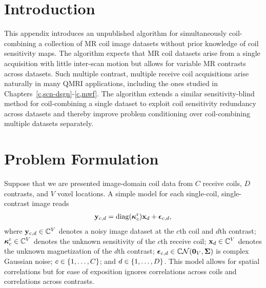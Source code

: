 
\section{Introduction}
\label{s,cc-multi,intro}

This appendix introduces
an unpublished algorithm
for simultaneously coil-combining 
a collection of MR coil image datasets
without prior knowledge 
of coil sensitivity maps.
The algorithm expects
that MR coil datasets arise
from a single acquisition
with little inter-scan motion
but allows for variable MR contrasts
across datasets.
Such multiple contrast, multiple receive coil acquisitions
arise naturally
in many QMRI applications,
including the ones studied in Chapters~\ref{c,scn-dsgn}-\ref{c,mwf}.
The algorithm extends 
a similar sensitivity-blind method
for coil-combining a single dataset
\cite{ying:07:jir}
to exploit coil sensitivity redundancy
across datasets
and thereby improve problem conditioning
over coil-combining multiple datasets separately.

\section{Problem Formulation}
\label{s,cc-multi,prob}

Suppose that we are presented image-domain coil data
from $C$ receive coils,
$D$ contrasts,
and $V$ voxel locations.
A simple model
for each single-coil, single-contrast image reads
\begin{align}
	\bmy_{c,d} = \diag{\bmsrx_{c}} \bmx_d + \bmeps_{c,d},
	\label{eq:cc-multi,model}
\end{align}
where $\mathbf{y}_{c,d} \in \mathbb{C}^{V}$ 
denotes a noisy image dataset
at the $c$th coil and $d$th contrast;
$\boldsymbol{\kappa}^\mathrm{r}_{c} \in \mathbb{C}^{V}$ 
denotes the unknown sensitivity 
of the $c$th receive coil;
$\mathbf{x}_d \in \mathbb{C}^{V}$ 
denotes the unknown magnetization
of the $d$th contrast;
$\bmeps_{c,d} \in \cgauss{\zeros{V}}{\bmSig}$ 
is complex Gaussian noise;
$c \in \set{1,\dots,C}$;
and $d \in \set{1,\dots,D}$.
This model allows for spatial correlations
but for ease of exposition
ignores correlations across coils
and correlations across contrasts.

